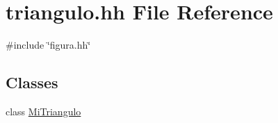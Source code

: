 \hypertarget{triangulo_8hh}{\section{triangulo.\-hh \-File \-Reference}
\label{triangulo_8hh}
}
{\ttfamily \#include \char`\"{}figura.\-hh\char`\"{}}\*
\subsection*{\-Classes}
\begin{DoxyCompactItemize}
\item 
class \hyperlink{class_mi_triangulo}{\-Mi\-Triangulo}
\end{DoxyCompactItemize}
